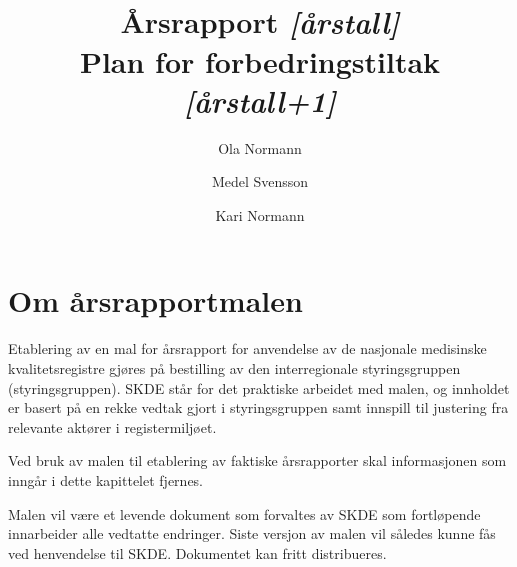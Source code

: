 \documentclass[norsk, a4paper, twocolumn]{report}
\title{\registernavn \\ \textbf{Årsrapport \textit{[årstall]}\\
Plan for forbedringstiltak \textit{[årstall+1]}}}
\author[1]{Ola Normann}
\author[2]{Medel Svensson}
\author[1]{Kari Normann}
\affil[1]{et Sykehus, et Foretak, et Sted}
\affil[2]{en annen adresse, et annet Sted}
\begin{document}
\maketitle


\onecolumn





\chapter*{Om årsrapportmalen}
Etablering av en mal for årsrapport for anvendelse av de nasjonale medisinske
kvalitetsregistre gjøres på bestilling av den interregionale styringsgruppen
(styringsgruppen).
SKDE står for det praktiske arbeidet med malen, og innholdet er basert på
en rekke vedtak gjort i styringsgruppen samt innspill til justering fra
relevante aktører i registermiljøet.

Ved bruk av malen til etablering av faktiske årsrapporter skal informasjonen
som inngår i dette kapittelet fjernes.

Malen vil være et levende dokument som
forvaltes av SKDE som fortløpende innarbeider alle vedtatte endringer. Siste
versjon av malen vil således kunne fås ved henvendelse til SKDE. Dokumentet
kan fritt distribueres.
\end{document}
